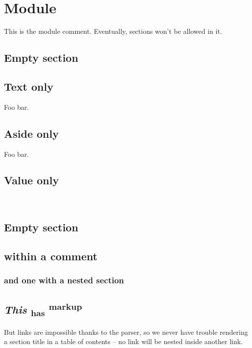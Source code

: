 \section{Module }\label{Section}%
This is the module comment. Eventually, sections won't be allowed in it.

\subsection{Empty section\label{Section--empty-section}}%
\subsection{Text only\label{Section--text-only}}%
Foo bar.

\subsection{Aside only\label{Section--aside-only}}%
Foo bar.

\subsection{Value only\label{Section--value-only}}%
\label{Section--val-foo}\\
\subsection{Empty section\label{Section--empty-section_2}}%
\subsection{within a comment\label{Section--within-a-comment}}%
\subsubsection{and one with a nested section\label{Section--and-one-with-a-nested-section}}%
\subsection{\emph{This}   \textsubscript{has} \textsuperscript{markup}\label{Section--this-section-title-has-markup}}%
But links are impossible thanks to the parser, so we never have trouble rendering a section title in a table of contents – no link will be nested inside another link.



